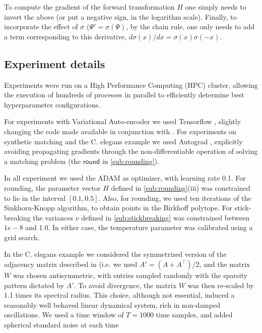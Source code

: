 \documentclass[twoside]{article}
\begin{document}
To compute the gradient of the forward transformation $H$ one simply needs to invert the above (or put a negative sign, in the logarithm scale). Finally,  to incorporate the effect of $\sigma$ ($\Psi'=\sigma(\Psi)$, by the chain rule,  one only needs to add a term corresponding to this derivative, $d\sigma(x)/dx=\sigma(x)\sigma(-x)$. 
\subsection*{Experiment details}

Experiments were run on a High Performance Computing (HPC) cluster, allowing the execution of hundreds of processes in parallel to efficiently determine best hyperparameter configurations.

For experiments with Variational Auto-encoder we used Tensorflow \citep{Abadi2016}, slightly changing the code made available in conjunction with \cite{Jang2016}. For experiments on synthetic matching and the C. elegans example we used Autograd  \citep{maclaurin2015autograd}, explicitly avoiding propagating gradients through the non-differentiable operation of solving a matching problem (the $\mathsf{round}$ in \ref{sub:rounding}).

In all experiment we used the ADAM as optimizer, with learning rate 0.1. For rounding, the parameter vector $H$ defined in \ref{sub:rounding}(iii) was constrained to lie in the interval $[0.1, 0.5]$. Also, for rounding, we used ten iterations of the Sinkhorn-Knopp algorithm, to obtain points in the Birkhoff polytope. For stick-breaking the variances $\nu$ defined in \ref{sub:stickbreaking} was constrained between $1e-8$ and 1.0. In either case, the temperature parameter was calibrated using a grid search.
 
In the C. elegans example we considered the symmetrized version of the adjacency matrix described in \citep{varshney2011structural} (i.e. we used $A'=(A+A^\top)/2$, and the matrix $W$ was chosen antisymmetric, with entries sampled randomly with the sparsity pattern dictated by $A'$. To avoid divergence, the matrix $W$ was then re-scaled by 1.1 times its spectral radius. This choice, although not essential, induced a reasonably well behaved linear dynamical system, rich in non-damped oscillations. We used a time window of $T=1000$ time samples, and added spherical standard noise at each time 




\end{document}
